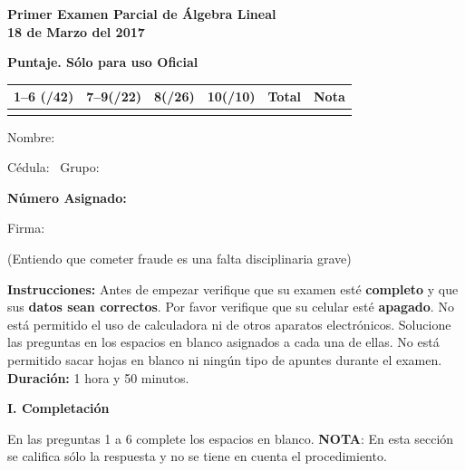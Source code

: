 \documentclass[11pt]{article}
\renewcommand{\examtitulo}{Primer Examen Parcial de Álgebra Lineal}
\renewcommand{\examfecha}{18 de Marzo del 2017}
\begin{document}

\vspace{4pt}
\noindent
\begin{minipage}[t]{0.46\linewidth}
\textbf{\examtitulo}\\
\textbf{\examfecha}

\vspace{4pt}
\textbf{Puntaje. Sólo para uso Oficial}\\[4pt]
\begin{tabular}{|c|c|c|c|c|c|}
\hline
1--6 (/42) & 7--9(/22) & 8(/26) & 10(/10) & \textbf{Total} & \textbf{Nota} \\ \hline
 & & & & & \\ \hline
\end{tabular}
\end{minipage}%
\hfill
\begin{minipage}[t]{0.5\linewidth}
Nombre: \dotfill

Cédula: \dotfill\ Grupo: \dotfill

\vspace{6pt}
\begin{center}\Large\textbf{Número Asignado:} \dotfill\end{center}

\vspace{34pt}
Firma: \dotfill

{\footnotesize (Entiendo que cometer fraude es una falta disciplinaria grave)}
\end{minipage}

\vspace{8pt}
\noindent\textbf{Instrucciones:} Antes de empezar verifique que su examen esté \textbf{completo} y que sus \textbf{datos sean correctos}. Por favor verifique que su celular esté \textbf{apagado}. No está permitido el uso de calculadora ni de otros aparatos electrónicos. Solucione las preguntas en los espacios en blanco asignados a cada una de ellas. No está permitido sacar hojas en blanco ni ningún tipo de apuntes durante el examen. \textbf{Duración:} 1 hora y 50 minutos.

\vspace{8pt}
\begin{center}\textbf{I. Completación}\end{center}
\noindent En las preguntas 1 a 6 complete los espacios en blanco. \textbf{NOTA}: En esta sección se califica sólo la respuesta y no se tiene en cuenta el procedimiento.
\end{document}
